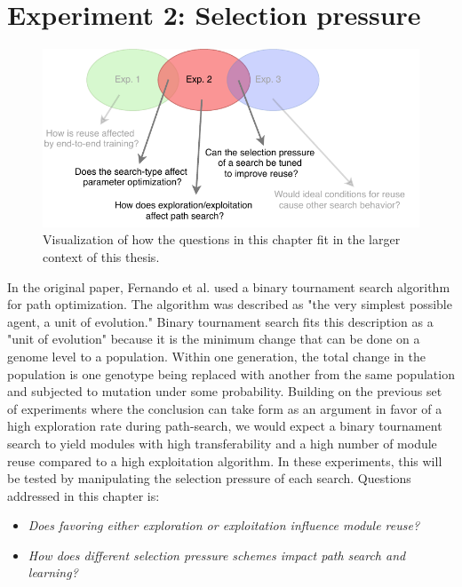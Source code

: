 \chapter{Experiment 2: Selection pressure}
\label{exp2}

\begin{figure}[hb]
    \includegraphics[width=\textwidth]{Chapters/4.Experiments/exp2/figures/exp2.pdf}
    \caption[Experiment focus]{Visualization of how the questions in this chapter fit in the larger context of this thesis.}
    \label{fig:exp2.questions}
\end{figure}

In the original paper, Fernando et al.\cite{pathnet} used a binary tournament search algorithm for path optimization. The algorithm was described as "the very simplest possible agent, a unit of evolution." Binary tournament search fits this description as a "unit of evolution" because it is the minimum change that can be done on a genome level to a population. Within one generation, the total change in the population is one genotype being replaced with another from the same population and subjected to mutation under some probability. Building on the previous set of experiments where the conclusion can take form as an argument in favor of a high exploration rate during path-search, we would expect a binary tournament search to yield modules with high transferability and a high number of module reuse compared to a high exploitation algorithm. In these experiments, this will be tested by manipulating the selection pressure of each search. Questions addressed in this chapter is: 
\begin{itemize}
    \item \emph{Does favoring either exploration or exploitation influence module reuse?}
    \item \emph{How does different selection pressure schemes impact path search and learning?}
\end{itemize}


